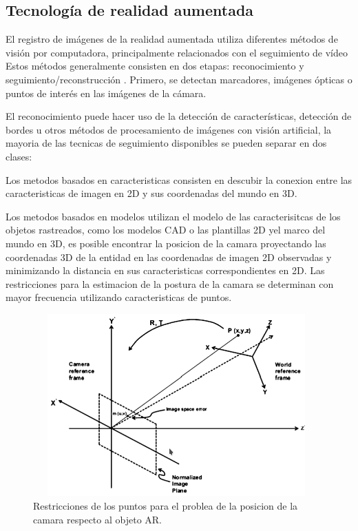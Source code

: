 \subsection{Tecnología de realidad aumentada}
El registro de imágenes de la realidad aumentada utiliza diferentes métodos de visión por computadora, principalmente relacionados con el seguimiento de vídeo Estos métodos generalmente consisten en dos etapas: reconocimiento y seguimiento/reconstrucción . Primero, se detectan marcadores, imágenes ópticas o puntos de interés en las imágenes de la cámara.\cite{BXX} \par
\vspace{5mm}
El reconocimiento puede hacer uso de la detección de características, detección de bordes u otros métodos de procesamiento de imágenes con visión artificial, la mayoria de las tecnicas de seguimiento disponibles se pueden separar en dos clases:\cite{BXX} \par
\vspace{5mm}
Los metodos basados en caracteristicas consisten en descubir la conexion entre las caracteristicas de imagen en 2D y sus coordenadas del mundo en 3D. \cite{BXX} \par
\vspace{5mm}
Los metodos basados en modelos utilizan el modelo de las caracterisitcas de los objetos rastreados, como los modelos CAD o las plantillas 2D yel marco del mundo en 3D, es posible encontrar la posicion de la camara proyectando las coordenadas 3D de la entidad en las coordenadas de imagen 2D observadas y minimizando la distancia en sus caracteristicas correspondientes en 2D. Las restricciones para la estimacion de la postura de la camara se determinan con mayor frecuencia utilizando caracteristicas de puntos.\cite{BXX}\par
\begin{figure}[h!]
	\centering
	\includegraphics[width=11cm,height=7cm]{imagenes/marcoteorico/ar/tecnologyAR.png}
	\caption{Restricciones de los puntos para el problea de la posicion de la camara respecto al objeto AR.\cite{BXX}}
	\label{fig:analogo}
\end{figure}
